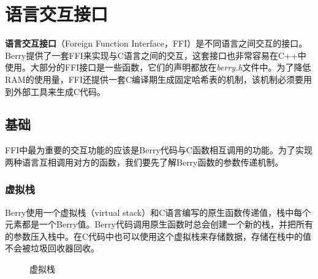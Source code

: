 \chapter{语言交互接口}

\textbf{语言交互接口}（Foreign Function Interface，FFI）是不同语言之间交互的接口。Berry提供了一套FFI来实现与C语言之间的交互，这套接口也非常容易在C++中使用。大部分的FFI接口是一些函数，它们的声明都放在\textit{berry.h}文件中。为了降低RAM的使用量，FFI还提供一套C编译期生成固定哈希表的机制，该机制必须要用到外部工具来生成C代码。

\section{基础}

FFI中最为重要的交互功能的应该是Berry代码与C函数相互调用的功能。为了实现两种语言互相调用对方的函数，我们要先了解Berry函数的参数传递机制。

\subsection{虚拟栈}

Berry使用一个虚拟栈（virtual stack）和C语言编写的原生函数传递值，栈中每个元素都是一个Berry值。Berry代码调用原生函数时总会创建一个新的栈，并把所有的参数压入栈中。在C代码中也可以使用这个虚拟栈来存储数据，存储在栈中的值不会被垃圾回收器回收。

\begin{wrapfigure}{r}{0.5\textwidth}
\centering
{}
\caption{虚拟栈}
\label{fig::virtual_stack}
\end{wrapfigure}

